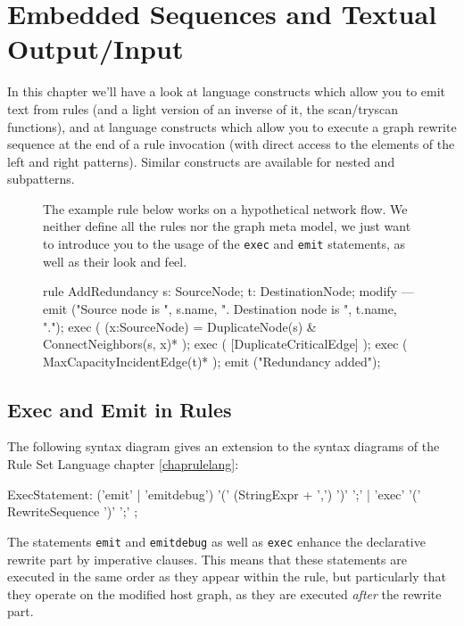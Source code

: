\chapter{Embedded Sequences and Textual Output/Input}
\label{cha:imperativeandstate}
\label{sct:imperative}

In this chapter we'll have a look at language constructs which allow you to emit text from rules (and a light version of an inverse of it, the scan/tryscan functions), and at language constructs which allow you to execute a graph rewrite sequence at the end of a rule invocation (with direct access to the elements of the left and right patterns).
Similar constructs are available for nested and subpatterns.

\begin{figure}[htbp]
\begin{example}
	The example rule below works on a hypothetical network flow.
	We neither define all the rules nor the graph meta model,
	we just want to introduce you to the usage of the \texttt{exec} and \texttt{emit} statements, as well as their look and feel.
	\begin{grgen}
rule AddRedundancy
{
  s: SourceNode;
  t: DestinationNode;
  modify {
  ---
    emit ("Source node is ", s.name, ". Destination node is ", t.name, ".");
    exec ( (x:SourceNode) = DuplicateNode(s) & ConnectNeighbors(s, x)* );
    exec ( [DuplicateCriticalEdge] );
    exec ( MaxCapacityIncidentEdge(t)* );
    emit ("Redundancy added");
  }
}
	\end{grgen}
\end{example}
\end{figure}

\section{Exec and Emit in Rules}\label{sct:execemitrules}

The following syntax diagram gives an extension to the syntax diagrams of the Rule Set Language chapter \ref{chaprulelang}:
\begin{rail}
  ExecStatement: ('emit' | 'emitdebug') '(' (StringExpr + ',') ')' ';' | 'exec' '(' RewriteSequence ')' ';'
	;
\end{rail}

The statements \texttt{emit} and \texttt{emitdebug} as well as \texttt{exec} enhance the declarative rewrite part by imperative clauses.
This means that these statements are executed in the same order as they appear within the rule,
but particularly that they operate on the modified host graph, as they are executed \emph{after} the rewrite part.

